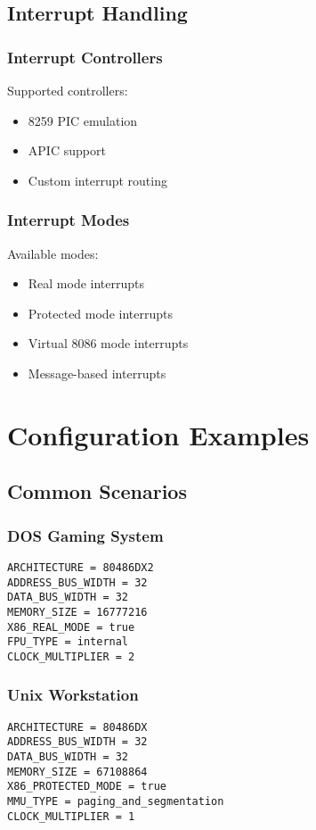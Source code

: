 \documentclass[a4paper,11pt]{book}
\begin{document}
\section{Interrupt Handling}
\subsection{Interrupt Controllers}
Supported controllers:
\begin{itemize}
    \item 8259 PIC emulation
    \item APIC support
    \item Custom interrupt routing
\end{itemize}

\subsection{Interrupt Modes}
Available modes:
\begin{itemize}
    \item Real mode interrupts
    \item Protected mode interrupts
    \item Virtual 8086 mode interrupts
    \item Message-based interrupts
\end{itemize}

\chapter{Configuration Examples}
\section{Common Scenarios}
\subsection{DOS Gaming System}
\begin{lstlisting}[style=fxmlstyle]
ARCHITECTURE = 80486DX2
ADDRESS_BUS_WIDTH = 32
DATA_BUS_WIDTH = 32
MEMORY_SIZE = 16777216
X86_REAL_MODE = true
FPU_TYPE = internal
CLOCK_MULTIPLIER = 2
\end{lstlisting}

\subsection{Unix Workstation}
\begin{lstlisting}[style=fxmlstyle]
ARCHITECTURE = 80486DX
ADDRESS_BUS_WIDTH = 32
DATA_BUS_WIDTH = 32
MEMORY_SIZE = 67108864
X86_PROTECTED_MODE = true
MMU_TYPE = paging_and_segmentation
CLOCK_MULTIPLIER = 1
\end{lstlisting}
\end{document}
